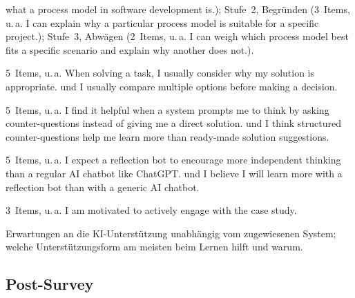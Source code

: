 \begin{description}
    what a process model in software development is.\grqq{}); Stufe~2, Begründen (3~Items, u.\,a.
    \glqq I can explain why a particular process model is suitable for a specific
    project.\grqq{}); Stufe~3, Abwägen (2~Items, u.\,a. \glqq I can weigh which process model best
    fits a specific scenario and explain why another does not.\grqq{}).
    \item[Reflexionsverhalten] 5~Items, u.\,a. \glqq When solving a task, I usually consider why my
    solution is appropriate.\grqq{} und \glqq I usually compare multiple options before making a
    decision.\grqq{}
    \item[Erwartungen an KI-Unterstützung beim Lernen] 5~Items, u.\,a. \glqq I find it helpful when
    a system prompts me to think by asking counter-questions instead of giving me a direct
    solution.\grqq{} und \glqq I think structured counter-questions help me learn more than
    ready-made solution suggestions.\grqq{}
    \item[Erwartungen im Systemvergleich] 5~Items, u.\,a. \glqq I expect a reflection bot to
    encourage more independent thinking than a regular AI chatbot like ChatGPT.\grqq{} und
    \glqq I believe I will learn more with a reflection bot than with a generic AI
    chatbot.\grqq{}
    \item[Motivation und Lernbereitschaft] 3~Items, u.\,a. \glqq I am motivated to actively engage
    with the case study.\grqq{}
    \item[Offene Fragen] Erwartungen an die KI-Unterstützung unabhängig vom zugewiesenen System;
    welche Unterstützungsform am meisten beim Lernen hilft und warum.
\end{description}

\subsection*{Post-Survey}


